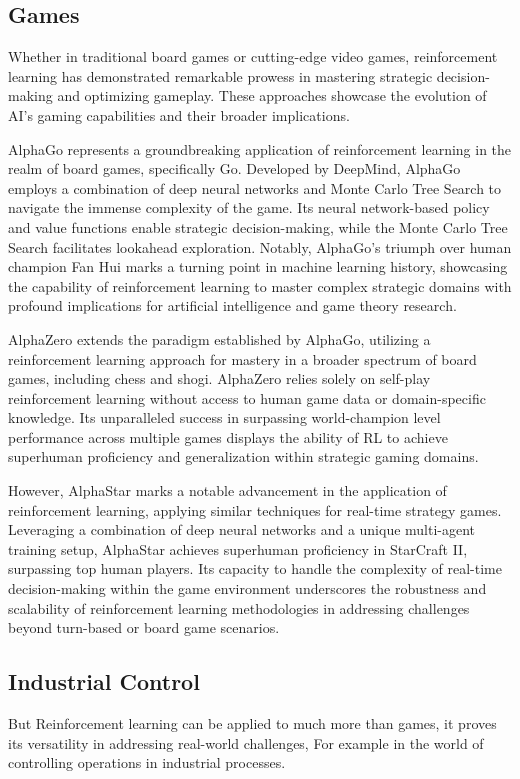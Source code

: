 \subsection*{Games}
Whether in traditional board games or cutting-edge video games, reinforcement learning has demonstrated remarkable prowess in mastering strategic decision-making and optimizing gameplay. These approaches showcase the evolution of AI's gaming capabilities and their broader implications.

AlphaGo\cite{silver2016mastering} represents a groundbreaking application of reinforcement learning in the realm of board games, specifically Go. Developed by DeepMind, AlphaGo employs a combination of deep neural networks and Monte Carlo Tree Search to navigate the immense complexity of the game. Its neural network-based policy and value functions enable strategic decision-making, while the Monte Carlo Tree Search facilitates lookahead exploration. Notably, AlphaGo's triumph over human champion Fan Hui marks a turning point in machine learning history, showcasing the capability of reinforcement learning to master complex strategic domains with profound implications for artificial intelligence and game theory research.

AlphaZero\cite{silver2017mastering} extends the paradigm established by AlphaGo, utilizing a reinforcement learning approach for mastery in a broader spectrum of board games, including chess and shogi. AlphaZero relies solely on self-play reinforcement learning without access to human game data or domain-specific knowledge. Its unparalleled success in surpassing world-champion level performance across multiple games displays the ability of RL to achieve superhuman proficiency and generalization within strategic gaming domains.

However, AlphaStar\cite{vinyals2019grandmaster} marks a notable advancement in the application of reinforcement learning, applying similar techniques for real-time strategy games. Leveraging a combination of deep neural networks and a unique multi-agent training setup, AlphaStar achieves superhuman proficiency in StarCraft II, surpassing top human players. Its capacity to handle the complexity of real-time decision-making within the game environment underscores the robustness and scalability of reinforcement learning methodologies in addressing challenges beyond turn-based or board game scenarios.

\subsection*{Industrial Control}
But Reinforcement learning can be applied to much more than games, it proves its versatility in addressing real-world challenges, For example in the world of controlling operations in industrial processes.

